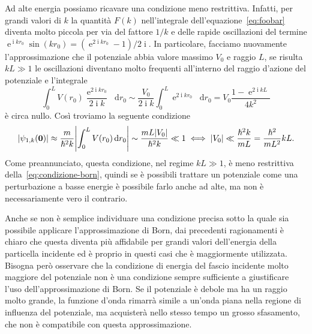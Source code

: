 \documentclass[a4paper,fleqn,twoside,12pt]{article}
\newcommand*{\dd}{\mathop{}\!\mathrm{d}} %
\DeclareMathOperator{\e}{\mathrm{e}} %
\DeclareMathOperator{\uimm}{\mathrm{i}} %
\DeclarePairedDelimiter{\abs}{\lvert}{\rvert}
\begin{document}
Ad alte energia possiamo ricavare una condizione meno restrittiva.  Infatti, per
grandi valori di $k$ la quantità $F(k)$ nell'integrale
dell'equazione~\eqref{eq:foobar} diventa molto piccola per via del fattore $1/k$
e delle rapide oscillazioni del termine
$\e^{\uimm kr_{0}}\sin(kr_{0}) = (\e^{2\uimm kr_{0}} - 1)/2\uimm$.  In
particolare, facciamo nuovamente l'approssimazione che il potenziale abbia
valore massimo $V_{0}$ e raggio $L$, se risulta $kL \gg 1$ le oscillazioni
diventano molto frequenti all'interno del raggio d'azione del potenziale e
l'integrale
\begin{equation}
  \int_{0}^{L} V(r_{0}) \frac{\e^{2\uimm kr_{0}}}{2\uimm k} \dd r_{0} \sim
  \frac{V_{0}}{2\uimm k} \int_{0}^{L} \e^{2\uimm kr_{0}} \dd r_{0} = V_{0}
  \frac{1 - \e^{2\uimm kL}}{4k^{2}}
\end{equation}
è circa nullo.  Così troviamo la seguente condizione
\begin{equation}
  \abs{\psi_{1,k}(\bm{0})} \approx \frac{m}{\hslash^{2}k}\abs*{\int_{0}^{L}
    V(r_{0}) \dd r_{0}} \sim \frac{mL\abs{V_{0}}}{\hslash^{2}k} \ll 1 \iff
  \abs{V_{0}} \ll \frac{\hslash^{2}k}{mL} =
  \frac{\hslash^{2}}{mL^{2}} kL. %
\end{equation}
Come preannunciato, questa condizione, nel regime $kL \gg 1$, è meno restrittiva
della~\eqref{eq:condizione-born}, quindi se è possibili trattare un potenziale
come una perturbazione a basse energie è possibile farlo anche ad alte, ma non è
necessariamente vero il contrario.

Anche se non è semplice individuare una condizione precisa sotto la quale sia
possibile applicare l'approssimazione di Born, dai precedenti ragionamenti è
chiaro che questa diventa più affidabile per grandi valori dell'energia della
particella incidente ed è proprio in questi casi che è maggiormente utilizzata.
Bisogna però osservare che la condizione di energia del fascio incidente molto
maggiore del potenziale non è una condizione sempre sufficiente a giustificare
l'uso dell'approssimazione di Born.  Se il potenziale è debole ma ha un raggio
molto grande, la funzione d'onda rimarrà simile a un'onda piana nella regione di
influenza del potenziale, ma acquisterà nello stesso tempo un grosso sfasamento,
che non è compatibile con questa approssimazione.
\end{document}
